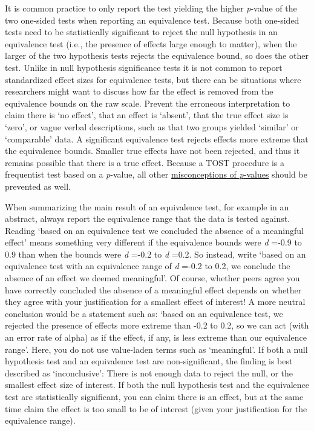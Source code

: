 \documentclass[
  oneside]{krantz}
\begin{document}
It is common practice to only report the test yielding the higher \emph{p}-value of the two one-sided tests when reporting an equivalence test. Because both one-sided tests need to be statistically significant to reject the null hypothesis in an equivalence test (i.e., the presence of effects large enough to matter), when the larger of the two hypothesis tests rejects the equivalence bound, so does the other test. Unlike in null hypothesis significance tests it is not common to report standardized effect sizes for equivalence tests, but there can be situations where researchers might want to discuss how far the effect is removed from the equivalence bounds on the raw scale. Prevent the erroneous interpretation to claim there is `no effect', that an effect is `absent', that the true effect size is `zero', or vague verbal descriptions, such as that two groups yielded `similar' or `comparable' data. A significant equivalence test rejects effects more extreme that the equivalence bounds. Smaller true effects have not been rejected, and thus it remains possible that there is a true effect. Because a TOST procedure is a frequentist test based on a \emph{p}-value, all other \protect\hyperlink{misconceptions}{misconceptions of \emph{p}-values} should be prevented as well.

When summarizing the main result of an equivalence test, for example in an abstract, always report the equivalence range that the data is tested against. Reading `based on an equivalence test we concluded the absence of a meaningful effect' means something very different if the equivalence bounds were \emph{d} =-0.9 to 0.9 than when the bounds were \emph{d} =-0.2 to \emph{d} =0.2. So instead, write `based on an equivalence test with an equivalence range of \emph{d} =-0.2 to 0.2, we conclude the absence of an effect we deemed meaningful'. Of course, whether peers agree you have correctly concluded the absence of a meaningful effect depends on whether they agree with your justification for a smallest effect of interest! A more neutral conclusion would be a statement such as: `based on an equivalence test, we rejected the presence of effects more extreme than -0.2 to 0.2, so we can act (with an error rate of alpha) as if the effect, if any, is less extreme than our equivalence range'. Here, you do not use value-laden terms such as `meaningful'. If both a null hypothesis test and an equivalence test are non-significant, the finding is best described as `inconclusive': There is not enough data to reject the null, or the smallest effect size of interest. If both the null hypothesis test and the equivalence test are statistically significant, you can claim there is an effect, but at the same time claim the effect is too small to be of interest (given your justification for the equivalence range).
\end{document}
